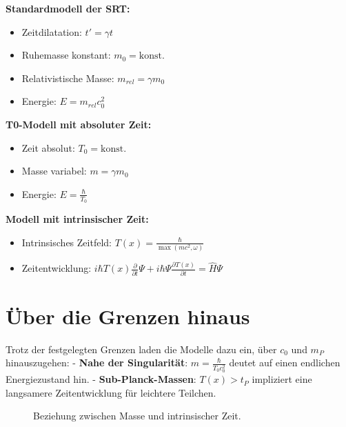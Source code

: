 \documentclass[a4paper,12pt]{article}
\newcommand{\Tfield}{T(x)}
\begin{document}
	\begin{tcolorbox}[colback=blue!5!white,colframe=blue!75!black,title=Definitionen der Modelle]
		\textbf{Standardmodell der SRT:}
		\begin{itemize}
			\item Zeitdilatation: \( t' = \gamma t \)
			\item Ruhemasse konstant: \( m_0 = \text{konst.} \)
			\item Relativistische Masse: \( m_{rel} = \gamma m_0 \)
			\item Energie: \( E = m_{rel}c_0^2 \)
		\end{itemize}
		\textbf{T0-Modell mit absoluter Zeit:}
		\begin{itemize}
			\item Zeit absolut: \( T_0 = \text{konst.} \)
			\item Masse variabel: \( m = \gamma m_0 \)
			\item Energie: \( E = \frac{\hbar}{T_0} \)
		\end{itemize}
		\textbf{Modell mit intrinsischer Zeit:}
		\begin{itemize}
			\item Intrinsisches Zeitfeld: \( \Tfield = \frac{\hbar}{\max(m c^2, \omega)} \)
			\item Zeitentwicklung: \( i\hbar \Tfield \frac{\partial}{\partial t} \Psi + i\hbar \Psi \frac{\partial \Tfield}{\partial t} = \hat{H} \Psi \)
		\end{itemize}
	\end{tcolorbox}
	
	\section{Über die Grenzen hinaus}
	Trotz der festgelegten Grenzen laden die Modelle dazu ein, über \( c_0 \) und \( m_P \) hinauszugehen:
	- \textbf{Nahe der Singularität}: \( m = \frac{\hbar}{T_0 c_0^2} \) deutet auf einen endlichen Energiezustand hin.
	- \textbf{Sub-Planck-Massen}: \( \Tfield > t_P \) impliziert eine langsamere Zeitentwicklung für leichtere Teilchen.
	
	\begin{figure}[h]
		\centering
		\caption{Beziehung zwischen Masse und intrinsischer Zeit.}
	\end{figure}
	
\end{document}
